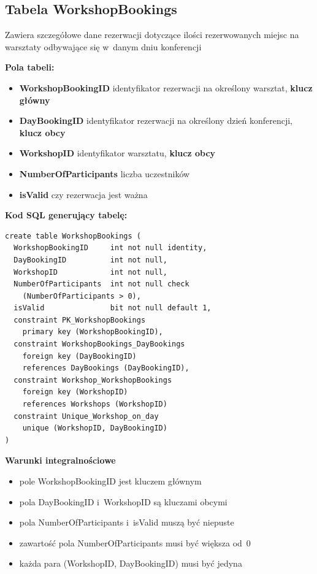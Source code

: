 \documentclass[12pt, a4paper]{mwrep}
\begin{document}
\subsection{Tabela WorkshopBookings}

\noindent Zawiera szczegółowe dane rezerwacji dotyczące ilości rezerwowanych miejsc na warsztaty odbywające się w~danym dniu konferencji

\vspace{0.5cm}

\noindent \textbf{Pola tabeli:}
\begin{itemize}
  \item \textbf{WorkshopBookingID} \ppauza identyfikator rezerwacji na określony warsztat, \textbf{klucz główny}
  \item \textbf{DayBookingID} \ppauza identyfikator rezerwacji na określony dzień konferencji, \textbf{klucz obcy}
  \item \textbf{WorkshopID} \ppauza identyfikator warsztatu, \textbf{klucz obcy}
  \item \textbf{NumberOfParticipants} \ppauza liczba uczestników
  \item \textbf{isValid} \ppauza czy rezerwacja jest ważna
\end{itemize}

\vspace{0.5cm}
\noindent \textbf{Kod SQL generujący tabelę:}

\begin{lstlisting}
create table WorkshopBookings (
  WorkshopBookingID     int not null identity,
  DayBookingID          int not null,
  WorkshopID            int not null,
  NumberOfParticipants  int not null check
    (NumberOfParticipants > 0),
  isValid               bit not null default 1,
  constraint PK_WorkshopBookings 
    primary key (WorkshopBookingID),
  constraint WorkshopBookings_DayBookings 
    foreign key (DayBookingID) 
    references DayBookings (DayBookingID),
  constraint Workshop_WorkshopBookings 
    foreign key (WorkshopID) 
    references Workshops (WorkshopID)
  constraint Unique_Workshop_on_day 
    unique (WorkshopID, DayBookingID)
)
\end{lstlisting}

\vspace{0.5cm}
\noindent \textbf{Warunki integralnościowe}
\begin{itemize}
  \item pole WorkshopBookingID jest kluczem głównym
  \item pola DayBookingID i~WorkshopID są kluczami obcymi
  \item pola NumberOfParticipants i~isValid muszą być niepuste
  \item zawartość pola NumberOfParticipants musi być większa od~0 
  \item każda para (WorkshopID, DayBookingID) musi być jedyna
\end{itemize}
\end{document}
